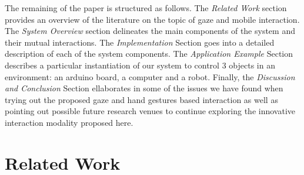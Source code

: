 \documentclass[jou,a4paper,notxfonts]{apa}
\begin{document}
The remaining of the paper is structured as follows. The \emph{Related Work} section provides an overview of the literature on the topic of gaze and mobile interaction. The \emph{System Overview} section delineates the main components of the system and their mutual interactions. The \emph{Implementation} Section goes into a detailed description of each of the system components. The \emph{Application Example} Section describes a particular instantiation of our system to control 3 objects in an environment: an arduino board, a computer and a robot. Finally, the \emph{Discussion and Conclusion} Section ellaborates in some of the issues we have found when trying out the proposed gaze and hand gestures based interaction as well as pointing out possible future research venues to continue exploring the innovative interaction modality proposed here.




\section{Related Work}
\end{document}
